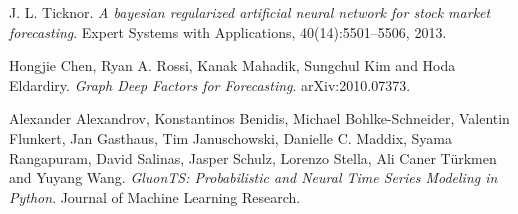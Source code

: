 \documentclass[en]{pracamgr}
\begin{document}
\begin{thebibliography}{99}
		 J. L. Ticknor. \textit{A bayesian regularized artificial neural network for stock market forecasting}. Expert Systems with Applications, 40(14):5501–5506, 2013.
		
		 Hongjie Chen, Ryan A. Rossi, Kanak Mahadik, Sungchul Kim and Hoda Eldardiry. \textit{Graph Deep Factors for Forecasting}. arXiv:2010.07373.
		
		 Alexander Alexandrov, Konstantinos Benidis, Michael Bohlke-Schneider, Valentin Flunkert, Jan Gasthaus, Tim Januschowski, Danielle C. Maddix, Syama Rangapuram, David Salinas, Jasper Schulz, Lorenzo Stella,
		Ali Caner Türkmen and Yuyang Wang. \textit{GluonTS: Probabilistic and Neural Time Series Modeling in Python}. Journal of Machine Learning Research.
		
	\end{thebibliography}
	
\end{document}
